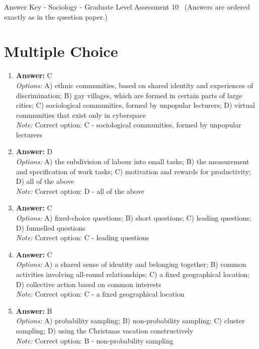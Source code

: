 \documentclass[12pt]{article}
\begin{document}
\begin{center}
Answer Key - Sociology - Graduate Level Assessment 10 \
\small (Answers are ordered exactly as in the question paper.)
\end{center}

\section*{Multiple Choice}
\begin{enumerate}[label=\arabic*.]
\item \textbf{Answer:} C
\\ \textit{Options:} A) ethnic communities, based on shared identity and experiences of discrimination; B) gay villages, which are formed in certain parts of large cities; C) sociological communities, formed by unpopular lecturers; D) virtual communities that exist only in cyberspace
\\ \textit{Note:} Correct option: C - sociological communities, formed by unpopular lecturers
\item \textbf{Answer:} D
\\ \textit{Options:} A) the subdivision of labour into small tasks; B) the measurement and specification of work tasks; C) motivation and rewards for productivity; D) all of the above
\\ \textit{Note:} Correct option: D - all of the above
\item \textbf{Answer:} C
\\ \textit{Options:} A) fixed-choice questions; B) short questions; C) leading questions; D) funnelled questions
\\ \textit{Note:} Correct option: C - leading questions
\item \textbf{Answer:} C
\\ \textit{Options:} A) a shared sense of identity and belonging together; B) common activities involving all-round relationships; C) a fixed geographical location; D) collective action based on common interests
\\ \textit{Note:} Correct option: C - a fixed geographical location
\item \textbf{Answer:} B
\\ \textit{Options:} A) probability sampling; B) non-probability sampling; C) cluster sampling; D) using the Christmas vacation constructively
\\ \textit{Note:} Correct option: B - non-probability sampling
\end{enumerate}
\end{document}
